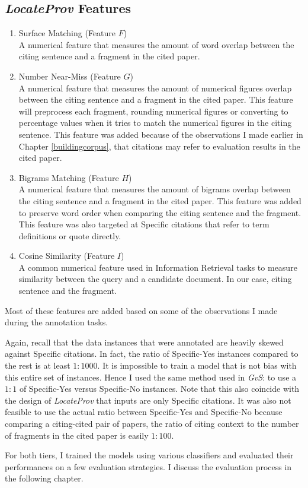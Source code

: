 \subsection*{{\it LocateProv} Features}
\begin{enumerate}
\item Surface Matching (Feature $F$)\\
A numerical feature that measures the amount of word overlap between the citing sentence and a fragment in the cited paper.

\item Number Near-Miss (Feature $G$)\\
A numerical feature that measures the amount of numerical figures overlap between the citing sentence and a fragment in the cited paper. This feature will preprocess each fragment, rounding numerical figures or converting to percentage values when it tries to match the numerical figures in the citing sentence. This feature was added because of the observations I made earlier in Chapter \ref{buildingcorpus}, that citations may refer to evaluation results in the cited paper.

\item Bigrams Matching (Feature $H$)\\
A numerical feature that measures the amount of bigrams overlap between the citing sentence and a fragment in the cited paper. This feature was added to preserve word order when comparing the citing sentence and the fragment. This feature was also targeted at Specific citations that refer to term definitions or quote directly.

\item Cosine Similarity (Feature $I$)\\
A common numerical feature used in Information Retrieval tasks to measure similarity between the query and a candidate document. In our case, citing sentence and the fragment.
\end{enumerate}
Most of these features are added based on some of the observations I made during the annotation tasks.

Again, recall that the data instances that were annotated are heavily skewed against Specific citations. In fact, the ratio of Specific-Yes instances compared to the rest is at least $1:1000$. It is impossible to train a model that is not bias with this entire set of instances. Hence I used the same method used in {\it GvS}: to use a $1:1$ of Specific-Yes versus Specific-No instances. Note that this also coincide with the design of {\it LocateProv} that inputs are only Specific citations. It was also not feasible to use the actual ratio between Specific-Yes and Specific-No because comparing a citing-cited pair of papers, the ratio of citing context to the number of fragments in the cited paper is easily $1:100$.

For both tiers, I trained the models using various classifiers and evaluated their performances on a few evaluation strategies. I discuss the evaluation process in the following chapter.